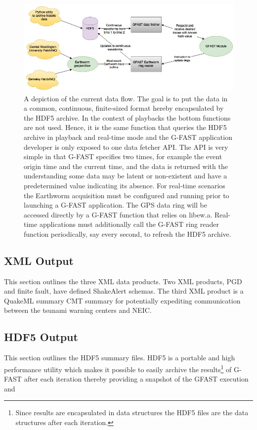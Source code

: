 \documentclass[12pt]{article}
\begin{document}
\begin{center}
\begin{figure}
\includegraphics[scale=0.55]{Figs/gfast_dataIO.jpg}
\caption{A depiction of the current data flow.  The goal is to put the data in a common, 
continuous, finite-sized format hereby encapsulated by the HDF5 archive.  
In the context of playbacks the bottom functions are not used.
Hence, it is the same function that queries the HDF5 archive in playback and 
real-time mode and the G-FAST application developer is only exposed to one data 
fetcher API.  The API is very simple in that G-FAST specifies two times, for example 
the event origin time and the current time, and the data is returned with the understanding
some data may be latent or non-existent and have a predetermined value indicating its absence. 
For real-time scenarios the Earthworm acquisition must be configured 
and running prior to launching a G-FAST application.   The GPS data ring will be accessed
directly by a G-FAST function that relies on libew.a.  Real-time applications 
must additionally call the G-FAST ring reader function periodically, say every second, 
to refresh the HDF5 archive.
}\label{F:gfastDataIO}
\end{figure}
\end{center}



\clearpage
\subsection{XML Output}
This section outlines the three XML data products.  Two XML products, PGD and finite fault, have
defined ShakeAlert schemas.  The third XML product is a QuakeML summary CMT summary for potentially
expediting communication between the tsunami warning centers and NEIC. 

\clearpage
\subsection{HDF5 Output}
This section outlines the HDF5 summary files.  HDF5 is a portable and high performance 
utility which makes it possible to easily archive the results\footnote{Since results are 
encapsulated in data structures the HDF5 files are the data structures after each iteration.}
of G-FAST after each iteration thereby providing a snapshot of the GFAST execution and 
\end{document}
